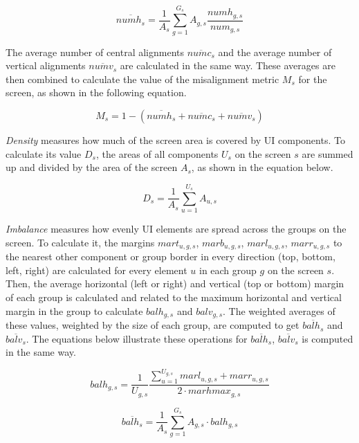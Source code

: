 \documentclass[11pt,titlepage,oneside,openany]{book}
\begin{document}
\begin{equation}
	\overline{numh_s} = \frac{1}{A_s} \sum_{g=1}^{G_s} A_{g,s} \frac{numh_{g,s}}{num_{g,s}}
\end{equation}

The average number of central alignments $\overline{numc_s}$ and the average number of vertical alignments $\overline{numv_s}$ are calculated in the same way. These averages are then combined to calculate the value of the misalignment metric $M_s$ for the screen, as shown in the following equation.

\begin{equation}
	M_s = 1 - (\overline{numh_s} + \overline{numc_s} + \overline{numv_s})
\end{equation}

\emph{Density} measures how much of the screen area is covered by UI components. To calculate its value $D_s$, the areas of all components $U_s$ on the screen $s$ are summed up and divided by the area of the screen $A_s$, as shown in the equation below.

\begin{equation}
	D_s = \frac{1}{A_s} \sum_{u=1}^{U_s} A_{u,s}
\end{equation}

\emph{Imbalance} measures how evenly UI elements are spread across the groups on the screen. To calculate it, the margins $mart_{u,g,s}$, $marb_{u,g,s}$, $marl_{u,g,s}$, $marr_{u,g,s}$ to the nearest other component or group border in every direction (top, bottom, left, right) are calculated for every element $u$ in each group $g$ on the screen $s$. Then, the average horizontal (left or right) and vertical (top or bottom) margin of each group is calculated and related to the maximum horizontal and vertical margin in the group to calculate $balh_{g,s}$ and $balv_{g,s}$. The weighted averages of these values, weighted by the size of each group, are computed to get $\overline{balh_s}$ and $\overline{balv_s}$. The equations below illustrate these operations for $\overline{balh_s}$, $\overline{balv_s}$ is computed in the same way.

\begin{equation}
	balh_{g,s} = \frac{1}{U_{g,s}} \frac{\sum_{u=1}^{U_{g,s}} marl_{u,g,s} + marr_{u,g,s}}{2 \cdot marhmax_{g,s}}
\end{equation}

\begin{equation}
	\overline{balh_s} = \frac{1}{A_s} \sum_{g=1}^{G_s} A_{g,s} \cdot balh_{g,s}
\end{equation}
\end{document}
